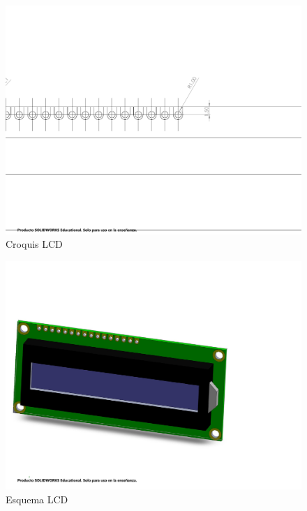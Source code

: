     \begin{figure}[H]
        \centering
        \includegraphics[trim = {10mm 10mm 10mm 10mm},clip,scale=0.2]{25/img/croquis LCD.pdf}
        \caption{Croquis LCD}
        \label{fig:lcd-16x2}
    \end{figure}
    \begin{figure}[H]
        \centering
        \includegraphics[trim = {10mm 10mm 10mm 10mm},clip,scale=0.2]{25/img/Lcd.pdf}
        \caption{Esquema LCD}
        \label{fig:lcd-16x2}
    \end{figure}
